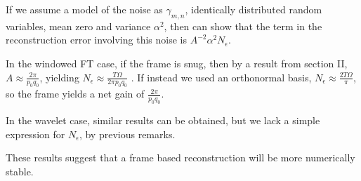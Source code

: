 \documentclass{beamer}
\newcommand{\eps}[0] {  \epsilon }
\begin{document}
\begin{frame}

\begin{flushleft}
If we assume a model of the noise as $\gamma_{m,n}$, identically distributed random variables, mean zero and variance $\alpha^2$, then can show that the term in the reconstruction error involving this noise is $A^{-2} \alpha^2 N_\eps$.
\end{flushleft}

\begin{flushleft}
In the windowed FT case, if the frame is snug, then by a result from section II, $A \approx \frac{2 \pi}{p_0 q_0}$, yielding $N_\eps \approx \frac{ T \Omega }{2 \pi p_0 q_0}$ . If instead we used an orthonormal basis, $N_\eps \approx \frac{ 2 T \Omega }{ \pi }$, so the frame yields a net gain of $\frac{2 \pi}{ p_0 q_0}$.
\end{flushleft}

\begin{flushleft}
In the wavelet case, similar results can be obtained, but we lack a simple expression for $N_\eps$, by previous remarks.
\end{flushleft}

\begin{flushleft}
These results suggest that a frame based reconstruction will be more numerically stable.
\end{flushleft}


\end{frame}
\end{document}
